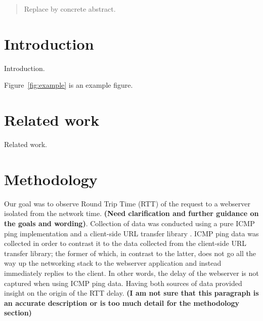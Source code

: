 \documentclass[twocolumn, 10pt, conference]{IEEEtran}
\begin{document}

\setlength{\belowdisplayskip}{10pt} \setlength{\belowdisplayshortskip}{10pt}
\setlength{\abovedisplayskip}{10pt} \setlength{\abovedisplayshortskip}{10pt}
\setlength{\textfloatsep}{10pt plus 1.0pt minus 2.0pt}
\setlength{\floatsep}{10pt plus 1.0pt minus 2.0pt}
\setlength{\intextsep}{10pt plus 1.0pt minus 2.0pt}

\begin{abstract}
Replace by concrete abstract.
\end{abstract}


\section{Introduction}
\label{sec:introduction}



Introduction.

Figure~\ref{fig:example} is an example figure.


\section{Related work}
\label{sec:related-work}
Related work.

\section{Methodology}
\label{sec:methodology}


Our goal was to observe Round Trip Time (RTT) of the request to a webserver isolated from the network time.
\textbf{(Need clarification and further guidance on the goals and wording)}. 
Collection of data was conducted using a pure ICMP ping implementation \cite{pypingdocs} and a client-side URL transfer library \cite{pycurldocs}. ICMP ping data was collected in order to contrast it to the data collected from the client-side URL transfer library; the former of which, in contrast to the latter, does not go all the way up the networking stack to the webserver application and instead immediately replies to the client. In other words, the delay of the webserver is not captured when using ICMP ping data. Having both sources of data provided insight on the origin of the RTT delay.
\textbf{(I am not sure that this paragraph is an accurate description or is too much detail for the methodology section)}
\end{document}
